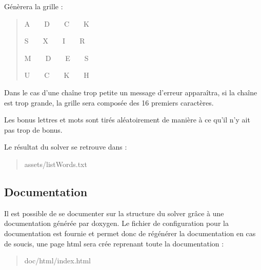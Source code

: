 Génèrera la grille \+:

\begin{quote}
A~~~~D~~~~C~~~~K

S~~~~X~~~~I~~~~R

M~~~~D~~~~E~~~~S

U~~~~C~~~~K~~~~H

\end{quote}


Dans le cas d'une chaîne trop petite un message d'erreur apparaîtra, si la chaîne est trop grande, la grille sera composée des 16 premiers caractères.

Les bonus lettres et mots sont tirés aléatoirement de manière à ce qu'il n'y ait pas trop de bonus.

Le résultat du solver se retrouve dans \+:

\begin{quote}
assets/list\+Words.\+txt \end{quote}


\subsection*{Documentation}

Il est possible de se documenter sur la structure du solver grâce à une documentation générée par doxygen. Le fichier de configuration pour la documentation est fournie et permet donc de régénérer la documentation en cas de soucis, une page html sera crée reprenant toute la documentation \+:

\begin{quote}
doc/html/index.\+html\end{quote}
